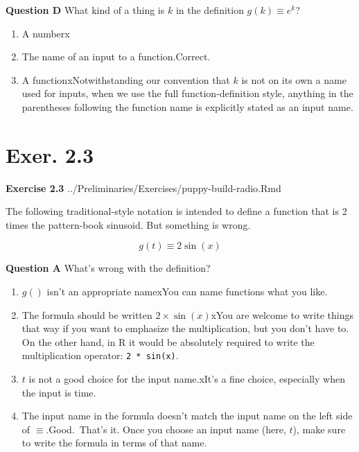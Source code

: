\documentclass[
  letterpaper,
  DIV=11,
  numbers=noendperiod,
  oneside]{article}
\providecommand{\tightlist}{%
  \setlength{\itemsep}{0pt}\setlength{\parskip}{0pt}}\usepackage{longtable,booktabs,array}
\begin{document}
\begin{multicols}{2}
\textbf{Question D} What kind of a thing is \(k\) in the definition
\(g(k) \equiv e^k\)?

\begin{enumerate}
\def\labelenumi{\roman{enumi}.}
\tightlist
\item
  {A number{x}}\\
\item
  {The name of an input to a function.{Correct.~}}\\
\item
  {A function{xNotwithstanding our convention that \(k\) is not on its
  own a name used for inputs, when we use the full function-definition
  style, anything in the parentheses following the function name is
  explicitly stated as an input name.}}
\end{enumerate}

\hypertarget{exer.-2.3}{%
\section*{Exer. 2.3}\label{exer.-2.3}}

\textbf{Exercise 2.3} ../Preliminaries/Exercises/puppy-build-radio.Rmd

The following traditional-style notation is intended to define a
function that is 2 times the pattern-book sinusoid. But something is
wrong.

\[g(t) \equiv 2 \sin(x)\]

\textbf{Question A} What's wrong with the definition?

\begin{enumerate}
\def\labelenumi{\roman{enumi}.}
\tightlist
\item
  {\(g()\) isn't an appropriate name{xYou can name functions what you
  like.}}\\
\item
  {The formula should be written \(2 \times \sin(x)\){xYou are welcome
  to write things that way if you want to emphasize the multiplication,
  but you don't have to. On the other hand, in R it would be absolutely
  required to write the multiplication operator:
  \texttt{2\ *\ sin(x)}.}}\\
\item
  {\(t\) is not a good choice for the input name.{xIt's a fine choice,
  especially when the input is time.}}\\
\item
  {The input name in the formula doesn't match the input name on the
  left side of \(\equiv\).{Good.~That's it. Once you choose an input
  name (here, \(t\)), make sure to write the formula in terms of that
  name.}}
\end{enumerate}


\end{multicols}
\end{document}
